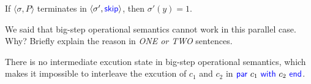 \documentclass[11pt,a4paper]{article}
\newcommand{\pair}[1]{\langle #1 \rangle}
\newcommand{\kword}[1]{{\color{blue} \textsf{#1}}}
\newcommand{\Skip}{\kword{skip}}
\newcommand{\End}{\kword{end}}
\newcommand{\Par}{\kword{par}}
\newcommand{\With}{\kword{with}}
\begin{document}
\begin{solution}
  If $\pair{\sigma, P}$ terminates in $\pair{\sigma', \Skip}$, then $\sigma'(y) = 1$.
\end{solution}

\subproblem We said that big-step operational semantics cannot work in this parallel case. Why?
Briefly explain the reason in \emph{ONE or TWO} sentences.

\begin{solution}
  There is no intermediate excution state in big-step operational semantics, which makes it impossible to interleave the excution of $c_1$ and $c_2$ in $\Par~c_1~\With~c_2~\End$.
\end{solution}

\end{document}
